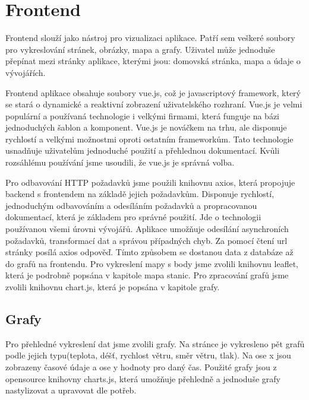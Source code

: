 \section{Frontend} \label{frontend}
Frontend slouží jako nástroj pro vizualizaci aplikace. Patří sem veškeré soubory pro vykreslování stránek, obrázky, mapa a grafy. Uživatel může jednoduše přepínat mezi stránky aplikace, kterými jsou: domovská stránka, mapa a údaje o vývojářích.

Frontend aplikace obsahuje soubory vue.js, což je javascriptový framework, který se stará o dynamické a reaktivní zobrazení uživatelského rozhraní. Vue.js je velmi populární a používaná technologie i velkými firmami, která funguje na bázi jednoduchých šablon a komponent.
Vue.js je nováčkem na trhu, ale disponuje rychlostí a velkými možnostmi oproti ostatním frameworkům.
Tato technologie usnadňuje uživatelům jednoduché použití a přehlednou dokumentací. Kvůli rozsáhlému používání jsme usoudili, že vue.js je správná volba. 

Pro odbavování HTTP požadavků jsme použili knihovnu axios, která propojuje backend s frontendem na základě jejich požadavkům. Disponuje rychlostí, jednoduchým odbavováním a odesíláním požadavků a propracovanou dokumentací, která je základem pro správné použití.
Jde o technologii používanou všemi úrovni vývojářů. Aplikace umožňuje odesílání asynchroních požadavků, transformací dat a správou případných chyb.
Za pomocí čtení url stránky posílá axios odpověď. Tímto způsobem se dostanou data z databáze až do grafů na frontendu. 
Pro vykreslení mapy s body jsme zvolili knihovnu leaflet, která je podrobně popsána v kapitole mapa stanic. Pro zpracování grafů jsme zvolili knihovnu chart.js, která je popsána v kapitole grafy.

\subsection{Grafy}
Pro přehledné vykreslení dat jsme zvolili grafy. Na stránce je vykresleno pět grafů podle jejich typu(teplota, déšť, rychlost větru, směr větru, tlak). %
Na ose x jsou zobrazeny časové údaje a ose y hodnoty pro daný čas. Použité grafy jsou z opensource knihovny charts.js, která umožňuje přehledně a jednoduše grafy nastylizovat a upravovat dle potřeb.

